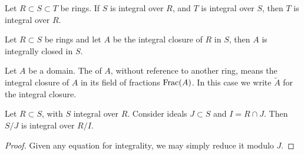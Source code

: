 \documentclass{ximera}
\begin{document}
\begin{corollary}
  Let $R\subset S \subset T$ be rings. If $S$ is integral over $R$,
  and $T$ is integral over $S$, then $T$ is integral over $R$.
\end{corollary}


\begin{corollary}
  Let $R\subset S$ be rings and let $A$ be the integral closure of $R$
  in $S$, then $A$ is integrally closed in $S$.
  
\end{corollary}


\begin{definition}
  Let $A$ be a domain. The  of $A$, without
  reference to another ring, means the integral closure of $A$ in its
  field of fractions $\operatorname{Frac}(A)$. In this case we write $\tilde{A}$ for
  the integral closure.
\end{definition}


\begin{proposition}
  Let $R\subset S$, with $S$ integral over $R$. Consider ideals
  $J\subset S$ and $I= R\cap J$. Then $S/J$ is integral over $R/I$.
  \begin{proof}
    Given any equation for integrality, we may simply reduce it modulo
    $J$.
  \end{proof}
\end{proposition}

\begin{proposition}
\end{proposition}
\end{document}
